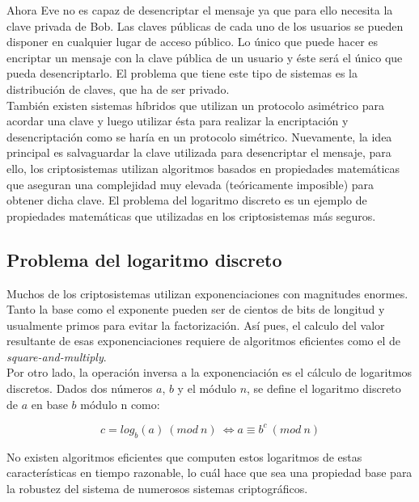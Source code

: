 \documentclass[../PFC.tex]{subfiles}
\begin{document}
Ahora Eve no es capaz de desencriptar el mensaje ya que para ello necesita la clave privada de Bob. Las claves públicas de cada uno de los usuarios se pueden disponer en cualquier lugar de acceso público. Lo único que puede hacer es encriptar un mensaje con la clave pública de un usuario y éste será el único que pueda desencriptarlo. El problema que tiene este tipo de sistemas es la distribución de claves, que ha de ser privado.
\*
\vspace{0.5515cm}
\\
También existen sistemas híbridos que utilizan un protocolo asimétrico para acordar una clave y luego utilizar ésta para realizar la encriptación y desencriptación como se haría en un protocolo simétrico. Nuevamente, la idea principal es salvaguardar la clave utilizada para desencriptar el mensaje, para ello, los criptosistemas utilizan algoritmos basados en propiedades matemáticas que aseguran una complejidad muy elevada (teóricamente imposible) para obtener dicha clave. El problema del logaritmo discreto es un ejemplo de propiedades matemáticas que utilizadas en los criptosistemas más seguros.

\subsection{Problema del logaritmo discreto}
\label{Problema del logaritmo discreto}

Muchos de los criptosistemas utilizan exponenciaciones con magnitudes enormes. Tanto la base como el exponente pueden ser de cientos de bits de longitud y usualmente primos para evitar la factorización. Así pues, el calculo del valor resultante de esas exponenciaciones requiere de algoritmos eficientes como el de \textit{square-and-multiply}\cite{squareMultiply}. 
\*
\vspace{0.5515cm}
\\
Por otro lado, la operación inversa a la exponenciación es el cálculo de logaritmos discretos. Dados dos números $a$, $b$ y el módulo $n$, se define el logaritmo discreto de $a$ en base $b$ módulo n como\cite{lucena}:

\begin{equation}
c = log_{b}(a)\ (mod\ n)\ \Leftrightarrow a \equiv b^c\ (mod\ n)
\end{equation}

No existen algoritmos eficientes que computen estos logaritmos de estas características en tiempo razonable, lo cuál hace que sea una propiedad base para la robustez del sistema de numerosos sistemas criptográficos.
\end{document}
